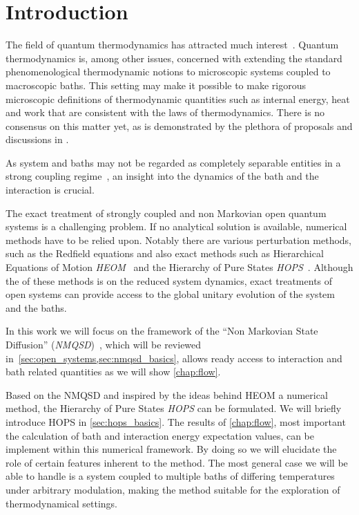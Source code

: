 \chapter{Introduction}
\label{chap:intro}
The field of quantum thermodynamics has attracted much
interest~\cite{Talkner2020Oct,Rivas2019Oct,Riechers2021Apr,Vinjanampathy2016Oct,Binder2018,Kurizki2021Dec}. Quantum
thermodynamics is, among other issues, concerned with extending the
standard phenomenological thermodynamic notions to microscopic systems
coupled to macroscopic baths. This setting may make it possible to
make rigorous microscopic definitions of thermodynamic quantities such
as internal energy, heat and work that are consistent with the laws of
thermodynamics. There is no consensus on this matter yet, as is
demonstrated by the plethora of proposals and discussions in
\cite{Rivas2019Oct,Talkner2020Oct,Motz2018Nov,Wiedmann2020Mar,Senior2020Feb,Kato2015Aug,Kato2016Dec,Strasberg2021Aug,Talkner2016Aug,Bera2021Feb,Bera2021Jun,Esposito2015Dec}.

As system and baths may not be regarded as completely separable
entities in a strong coupling
regime~\cite{Rivas2019Oct,Esposito2015Dec}, an insight into the
dynamics of the bath and the interaction is crucial.

The exact treatment of strongly coupled and non Markovian open quantum
systems is a challenging problem.  If no analytical solution is
available, numerical methods have to be relied upon. Notably there are
various perturbation methods, such as the Redfield equations and also
exact methods such as Hierarchical Equations of Motion
\emph{HEOM}~\cite{Tanimura1990Jun} and the Hierarchy of Pure States
\emph{HOPS}~\cite{Suess2014Oct}. Although the of these methods is on
the reduced system dynamics, exact treatments of open systems can
provide access to the global unitary evolution of the system and the
baths.


In this work we will focus on the framework of the ``Non Markovian
State Diffusion'' (\emph{NMQSD})~\cite{Diosi1998Mar}, which will be
reviewed in~\cref{sec:open_systems,sec:nmqsd_basics}, allows ready
access to interaction and bath related quantities as we will show
\cref{chap:flow}.

Based on the NMQSD and inspired by the ideas behind HEOM a numerical
method, the Hierarchy of Pure States \emph{HOPS} can be formulated. We
will briefly introduce HOPS in \cref{sec:hops_basics}. The results of
\cref{chap:flow}, most important the calculation of bath and
interaction energy expectation values, can be implement within this
numerical framework. By doing so we will elucidate the role of certain
features inherent to the method. The most general case we will be able
to handle is a system coupled to multiple baths of differing
temperatures under arbitrary modulation, making the method suitable
for the exploration of thermodynamical settings.

